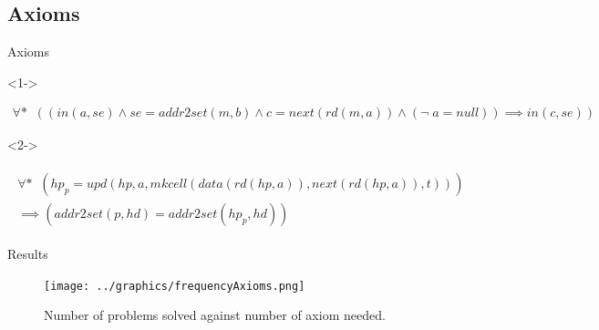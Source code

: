 \documentclass[10pt,notes,compress,usetitleprogressbar,aspectratio=1610]{beamer}
\begin{document}
\subsection{Axioms}
\begin{frame}{Axioms}

	\begin{block}<1->{}
		\begin{axiomdescription}[nextreg]
			\label{ax::nextreg}
			\begin{align*}
				\forall \ast \;\; ((in(a,se) \wedge se = addr2set(m,b) \wedge c = next(rd(m,a)) \wedge (\neg\;  a = null))\implies in(c,se))
			\end{align*}
		\end{axiomdescription}
	\end{block}
	\begin{block}<2->{}
		\begin{axiomdescription}
			\label{ax::lock_keeps_addr2set}
			\begin{align*}
				\begin{array}{r}
				\forall \ast \;\; (hp_p = upd(hp,a,mkcell(data(rd(hp,a)),next(rd(hp,a)),t))) 
				\\
				\implies (addr2set(p,hd) = addr2set(hp_p,hd))
				\end{array}
			\end{align*}
		\end{axiomdescription}
	\end{block}

\end{frame}

\begin{frame}{Results}
	\begin{figure}[hbtp]
		\centering
		\texttt{[image: ../graphics/frequencyAxioms.png]}
		\caption{Number of problems solved against number of axiom needed.}
		\label{fig:frequencyAxioms}
	\end{figure}

\end{frame}
\end{document}

